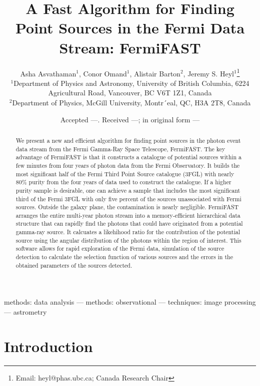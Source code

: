 \documentclass[useAMS,usenatbib]{mn2e}
\title[FermiFAST]{A Fast Algorithm for Finding Point Sources
in the Fermi Data Stream: FermiFAST}
\author[A. Asvathaman {\em et al.}]{Asha Asvathaman$^{1}$, Conor Omand$^{1}$, Alistair Barton$^{2}$,
  Jeremy S. Heyl$^{1}$\thanks{Email: heyl@phas.ubc.ca; Canada Research Chair} \\
$^{1}$Department of Physics and Astronomy, University of British
  Columbia, 6224 Agricultural Road, Vancouver, BC V6T 1Z1, Canada\\
$^{2}$Department of Physics, McGill University, Montr´eal, QC, H3A 2T8, Canada}
\begin{document}
\date{Accepted ---. Received ---; in original form ---}

\pagerange{\pageref{firstpage}--\pageref{lastpage}} 

\maketitle

\label{firstpage}

\begin{abstract}
  We present a new and efficient algorithm for finding point sources
  in the photon event data stream from the Fermi Gamma-Ray Space
  Telescope, FermiFAST. The key advantage of FermiFAST is that it
  constructs a catalogue of potential sources within a few minutes
  from four years of photon data from the Fermi Observatory.  It
  builds the most significant half of the Fermi Third Point Source
  catalogue (3FGL) with nearly 80\% purity from the four years of data
  used to construct the catalogue.  If a higher purity sample is
  desirable, one can achieve a sample that includes the most
  significant third of the Fermi 3FGL with only five percent of the
  sources unassociated with Fermi sources.  Outside the galaxy plane,
  the contamination is nearly negligible. FermiFAST arranges the
  entire multi-year photon stream into a memory-efficient hierarchical
  data structure that can rapidly find the photons that could have
  originated from a potential gamma-ray source.  It calcuates a
  likehihood ratio for the contribution of the potential source using
  the angular distribution of the photons within the region of
  interest.  This software allows for rapid exploration of the Fermi
  data, simulation of the source detection to calculate the selection
  function of various sources and the errors in the obtained
  parameters of the sources detected.
\end{abstract}

\begin{keywords}
methods: data analysis --- methods: observational --- techniques:
image processing --- astrometry
\end{keywords}

\section{Introduction}
\end{document}
